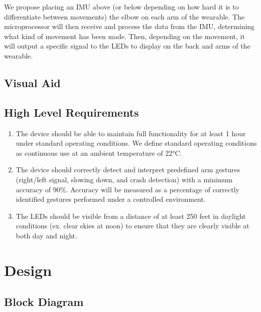 \documentclass[12pt]{article}
\begin{document}
We propose placing an IMU above (or below depending on how hard 
it is to differentiate between movements) the elbow on each arm 
of the wearable. The microprocessor will then receive and process 
the data from the IMU, determining what kind of movement has been 
made. Then, depending on the movement, it will output a specific 
signal to the LEDs to display on the back and arms of the wearable. 

\newpage
\subsection{Visual Aid}
\subsection{High Level Requirements}
\begin{enumerate}
    \item The device should be able to maintain full functionality 
    for at least 1 hour under standard operating conditions. 
    We define standard operating conditions as continuous use 
    at an ambient temperature of 22°C. 

    \item The device should correctly detect and interpret 
    predefined arm gestures (right/left signal, slowing down, and 
    crash detection) with a minimum accuracy of 90\%. Accuracy 
    will be measured as a percentage of correctly identified 
    gestures performed under a controlled environment. 
    \item The LEDs should be visible from a distance of at least 
    250 feet in daylight conditions (ex. clear skies at noon) to ensure that they are clearly visible at both day and night. 

\end{enumerate}

\newpage
\section{Design}
\subsection{Block Diagram}
\end{document}
